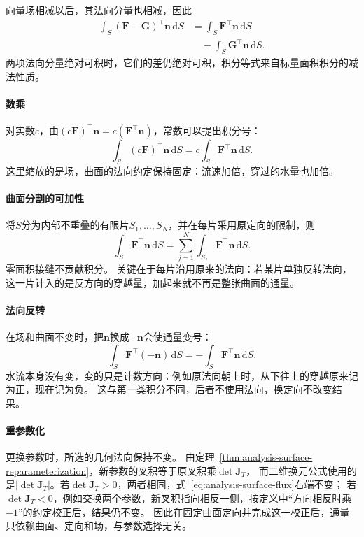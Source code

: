 向量场相减以后，其法向分量也相减，因此
\[
 \begin{aligned}
 \int_S(\bm F-\bm G)^\top\bm n\,\mathrm dS
 &=\int_S\bm F^\top\bm n\,\mathrm dS\\
 &\quad{}-\int_S\bm G^\top\bm n\,\mathrm dS.
 \end{aligned}
\]
两项法向分量绝对可积时，它们的差仍绝对可积，积分等式来自标量面积积分的减法性质。

\paragraph{数乘}

对实数$c$，由$(c\bm F)^\top\bm n=c(\bm F^\top\bm n)$，常数可以提出积分号：
\[
 \int_S(c\bm F)^\top\bm n\,\mathrm dS
 =c\int_S\bm F^\top\bm n\,\mathrm dS.
\]
这里缩放的是场，曲面的法向约定保持固定：流速加倍，穿过的水量也加倍。

\paragraph{曲面分割的可加性}

将$S$分为内部不重叠的有限片$S_1,\ldots,S_N$，并在每片采用原定向的限制，则
\[
 \int_S\bm F^\top\bm n\,\mathrm dS
 =\sum_{j=1}^N\int_{S_j}\bm F^\top\bm n\,\mathrm dS.
\]
零面积接缝不贡献积分。
关键在于每片沿用原来的法向：若某片单独反转法向，这一片计入的是反方向的穿越量，加起来就不再是整张曲面的通量。

\paragraph{法向反转}

在场和曲面不变时，把$\bm n$换成$-\bm n$会使通量变号：
\[
 \int_S\bm F^\top(-\bm n)\,\mathrm dS
 =-\int_S\bm F^\top\bm n\,\mathrm dS.
\]
水流本身没有变，变的只是计数方向：例如原法向朝上时，从下往上的穿越原来记为正，现在记为负。
这与第一类积分不同，后者不使用法向，换定向不改变结果。

\paragraph{重参数化}

更换参数时，所选的几何法向保持不变。
由定理~\ref{thm:analysis-surface-reparameterization}，新参数的叉积等于原叉积乘$\det\bm J_T$，
而二维换元公式使用的是$|\det\bm J_T|$。若$\det\bm J_T>0$，两者相同，式~\eqref{eq:analysis-surface-flux}右端不变；
若$\det\bm J_T<0$，例如交换两个参数，新叉积指向相反一侧，按定义中“方向相反时乘$-1$”的约定校正后，结果仍不变。
因此在固定曲面定向并完成这一校正后，通量只依赖曲面、定向和场，与参数选择无关。


